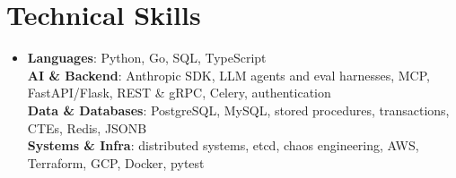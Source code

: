 \documentclass[letterpaper,11pt]{article}
\begin{document}
\section{Technical Skills}
\begin{itemize}[leftmargin=0.15in, label={}]
  \small\item{
    \textbf{Languages}{:  Python, Go, SQL, TypeScript} \\
    \textbf{AI \& Backend}{:  Anthropic SDK, LLM agents and eval harnesses, MCP, FastAPI/Flask, REST \& gRPC, Celery, authentication} \\
    \textbf{Data \& Databases}{:  PostgreSQL, MySQL, stored procedures, transactions, CTEs, Redis, JSONB} \\
    \textbf{Systems \& Infra}{:  distributed systems, etcd, chaos engineering, AWS, Terraform, GCP, Docker, pytest}
  }
\end{itemize}
\end{document}
